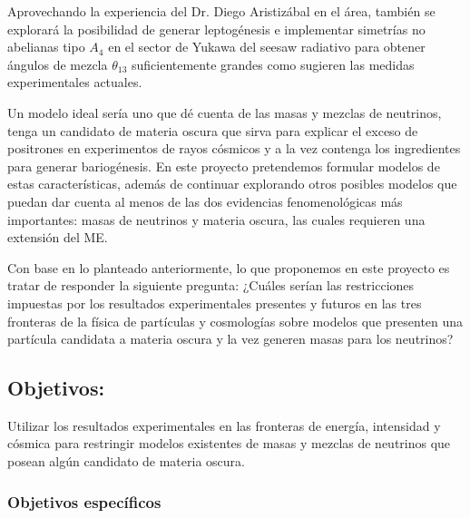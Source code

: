 \begin{leptogenesis}
  Aprovechando la experiencia del Dr. Diego Aristizábal en el área,
  también se explorará la posibilidad de generar leptogénesis e
  implementar simetrías no abelianas tipo $A_4$ en el sector de Yukawa
  del seesaw radiativo para obtener ángulos de mezcla $\theta_{13}$
  suficientemente grandes como sugieren las medidas experimentales
  actuales.
\end{leptogenesis}

Un modelo ideal sería uno que dé cuenta de las masas y mezclas de
neutrinos, tenga un candidato de materia oscura que sirva para explicar
el exceso de positrones en experimentos de rayos cósmicos y a la vez
contenga los ingredientes para generar bariogénesis.  En este
proyecto pretendemos formular modelos de estas características, además
de continuar explorando otros posibles modelos que puedan dar cuenta
al menos de las dos evidencias fenomenológicas más importantes: masas
de neutrinos y materia oscura, las cuales requieren una extensión del
ME.


Con base en lo planteado anteriormente, lo que proponemos en este
proyecto es tratar de responder la siguiente pregunta: ¿Cuáles serían
las restricciones impuestas por los resultados experimentales
presentes y futuros en las tres fronteras de la física de partículas y
cosmologías sobre modelos que presenten una partícula candidata a
materia oscura y la vez generen masas para los neutrinos?
 

\subsection{Objetivos:                                     }
Utilizar los resultados experimentales en las fronteras de energía,
intensidad y cósmica para restringir modelos existentes de masas y
mezclas de neutrinos que posean algún candidato de materia oscura.

\subsubsection{Objetivos específicos}
\label{sec:objet-espec}

